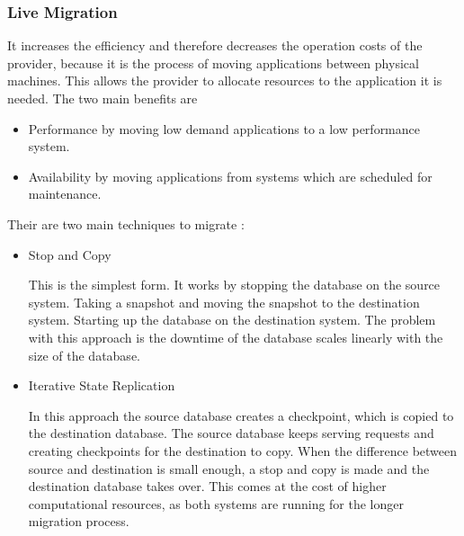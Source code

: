 \subsubsection{Live Migration \cite{sakr2014cloud}}
It increases the efficiency and therefore decreases the operation costs of the provider, because it is the process of moving applications between physical machines. This allows the provider to allocate resources to the application it is needed. The two main benefits are
\begin{itemize}
    \item Performance by moving low demand applications to a low performance system.
    \item Availability by moving applications from systems which are scheduled for maintenance.
\end{itemize}

Their are two main techniques to migrate \cite{sakr2014cloud}:
\begin{itemize}
    \item Stop and Copy
    
    This is the simplest form. It works by stopping the database on the source system. Taking a snapshot and moving the snapshot to the destination system. Starting up the database on the destination system. The problem with this approach is the downtime of the database scales linearly with the size of the database.
    
    \item Iterative State Replication
    
    In this approach the source database creates a checkpoint, which is copied to the destination database. The source database keeps serving requests and creating checkpoints for the destination to copy. When the difference between source and destination is small enough, a stop and copy is made and the destination database takes over. This comes at the cost of higher computational resources, as both systems are running for the longer migration process. 
\end{itemize}

